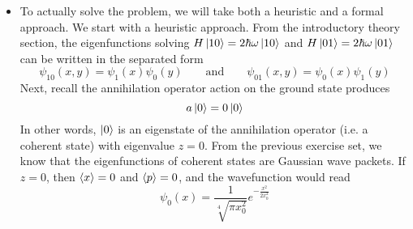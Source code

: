 \documentclass[11pt, a4paper]{article}
\newcommand{\eqtext}[1]{\qquad \text{#1} \qquad}
\begin{document}
\begin{itemize}
	\item To actually solve the problem, we will take both a heuristic and a formal approach. We start with a heuristic approach. From the introductory theory section, the eigenfunctions solving $ H \ket{10} = 2\hbar \omega \ket{10}$ and $ H \ket{01} = 2\hbar \omega \ket{01}$ can be written in the separated form
	\begin{equation*}
		\psi_{10}(x, y) = \psi_{1}(x)\psi_{0}(y) \eqtext{and} \psi_{01}(x, y) = \psi_{0}(x)\psi_{1}(y)
	\end{equation*}
%	
	Next, recall the annihilation operator action on the ground state produces
	\begin{equation*}
		a \ket{0} = 0 \ket{0}
	\end{equation*}
	In other words, $ \ket{0} $ is an eigenstate of the annihilation operator (i.e. a coherent state) with eigenvalue $ z = 0 $. From the previous exercise set, we know that the eigenfunctions of coherent states are Gaussian wave packets. If $ z = 0 $, then $ \ev{x} = 0 $ and $ \ev{p} = 0 $, and the wavefunction would read
	\begin{equation*}
		\psi_{0}(x) = \frac{1}{\sqrt[4]{\pi x_{0}^{2}}}e^{-\frac{x^{2}}{2x_{0}^{2}}}
	\end{equation*}


\end{itemize}
\end{document}
